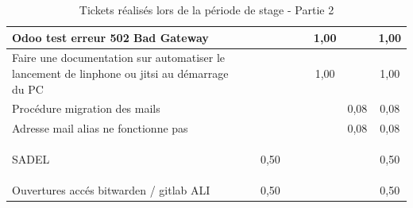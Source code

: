\documentclass[12pt, a4paper, twoside]{article}
\begin{document}
\begin{table}[!ht]
\begin{adjustbox}{max width=\textwidth}
\begin{tabular}{|p{6cm}|c|c|c|c|c|c|c|}
        Odoo test erreur 502 Bad Gateway &  &  &  &  & 1,00 &  & 1,00 \\ \hline
        Faire une documentation sur automatiser le lancement de linphone ou jitsi au démarrage du PC &  &  &  &  & 1,00 &  & 1,00 \\ \hline
        Procédure migration des mails &  &  &  &  &  & 0,08 & 0,08 \\ \hline
        Adresse mail alias ne fonctionne pas &  &  &  &  &  & 0,08 & 0,08 \\ \hline
        \begin{code}SADEL\end{code} &  & 0,50 &  &  &  &  & 0,50 \\ \hline
        Ouvertures accés bitwarden / gitlab ALI &  & 0,50 &  &  &  &  & 0,50 \\ \hline
    \end{tabular}
    \end{adjustbox}
    \caption{Tickets réalisés lors de la période de stage - Partie 2}
\end{table}
\end{document}
